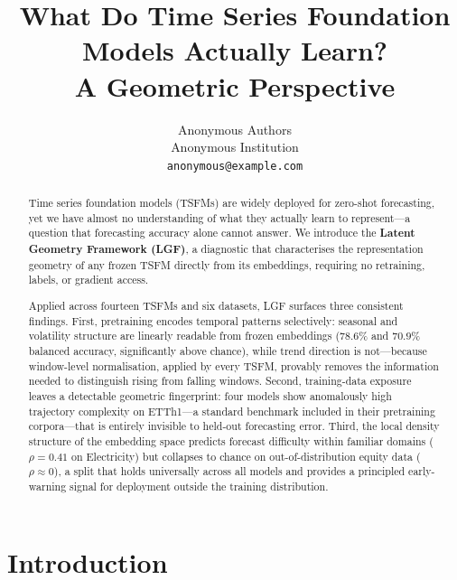 \documentclass[10pt]{article}
\title{What Do Time Series Foundation Models Actually Learn?\\
       A Geometric Perspective}
\author{%
  Anonymous Authors\\
  Anonymous Institution\\
  \texttt{anonymous@example.com}
}
\theoremstyle{definition}
\theoremstyle{remark}
\begin{document}
\maketitle

\begin{abstract}
Time series foundation models (TSFMs) are widely deployed for zero-shot
forecasting, yet we have almost no understanding of what they actually
learn to represent---a question that forecasting accuracy alone cannot answer.
We introduce the \textbf{Latent Geometry Framework (LGF)}, a diagnostic
that characterises the representation geometry of any frozen TSFM directly
from its embeddings, requiring no retraining, labels, or gradient access.

Applied across fourteen TSFMs and six datasets, LGF surfaces three consistent
findings.
First, pretraining encodes temporal patterns selectively: seasonal and
volatility structure are linearly readable from frozen embeddings ($78.6\%$
and $70.9\%$ balanced accuracy, significantly above chance), while trend
direction is not---because window-level normalisation, applied by every
TSFM, provably removes the information needed to distinguish rising from
falling windows.
Second, training-data exposure leaves a detectable geometric fingerprint:
four models show anomalously high trajectory complexity on ETTh1---a
standard benchmark included in their pretraining corpora---that is entirely
invisible to held-out forecasting error.
Third, the local density structure of the embedding space predicts forecast
difficulty within familiar domains ($\rho = 0.41$ on Electricity) but
collapses to chance on out-of-distribution equity data ($\rho \approx 0$),
a split that holds universally across all models and provides a principled
early-warning signal for deployment outside the training distribution.
\end{abstract}

\section{Introduction}
\label{sec:intro}
\end{document}
